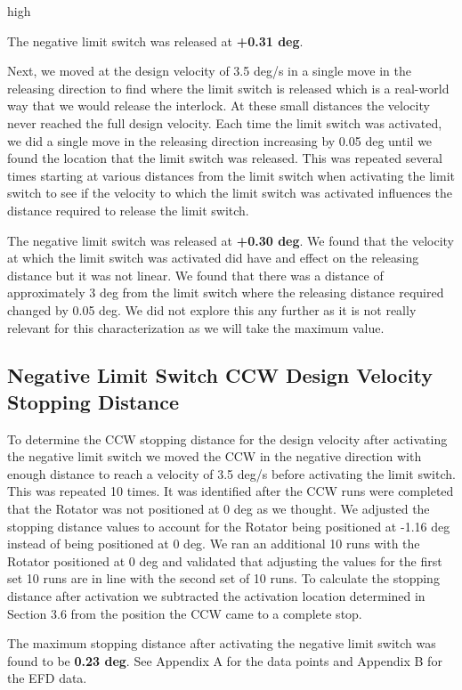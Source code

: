 high\documentclass[SE,lsstdraft,authoryear,toc]{lsstdoc}
\begin{document}
The negative limit switch was released at \textbf{+0.31 deg}.

Next, we moved at the design velocity of 3.5 deg/s in a single move in
the releasing direction to find where the limit switch is released which
is a real-world way that we would release the interlock. At these small
distances the velocity never reached the full design velocity. Each time
the limit switch was activated, we did a single move in the releasing
direction increasing by 0.05 deg until we found the location that the
limit switch was released. This was repeated several times starting at
various distances from the limit switch when activating the limit switch
to see if the velocity to which the limit switch was activated
influences the distance required to release the limit switch.

The negative limit switch was released at \textbf{+0.30 deg}. We found
that the velocity at which the limit switch was activated did have and
effect on the releasing distance but it was not linear. We found that
there was a distance of approximately 3 deg from the limit switch where
the releasing distance required changed by 0.05 deg. We did not explore
this any further as it is not really relevant for this characterization
as we will take the maximum value.

\subsection{Negative Limit Switch CCW Design Velocity Stopping Distance}

To determine the CCW stopping distance for the design velocity after
activating the negative limit switch we moved the CCW in the negative
direction with enough distance to reach a velocity of 3.5 deg/s before
activating the limit switch. This was repeated 10 times. It was
identified after the CCW runs were completed that the Rotator was not
positioned at 0 deg as we thought. We adjusted the stopping distance
values to account for the Rotator being positioned at -1.16 deg instead
of being positioned at 0 deg. We ran an additional 10 runs with the
Rotator positioned at 0 deg and validated that adjusting the values for
the first set 10 runs are in line with the second set of 10 runs. To
calculate the stopping distance after activation we subtracted the
activation location determined in Section 3.6 from the position the CCW
came to a complete stop.

The maximum stopping distance after activating the negative limit switch
was found to be \textbf{0.23 deg}. See Appendix A for the data points
and Appendix B for the EFD data.
\end{document}
